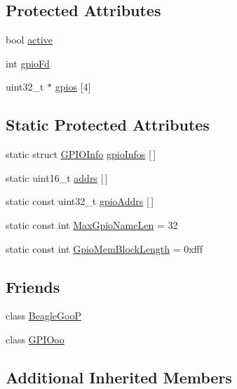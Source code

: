 \subsection*{Protected Attributes}
\begin{DoxyCompactItemize}
\item 
bool \hyperlink{struct_beagle_goo_a64e92bad467b29cb868bec64d1f6be6f}{active}
\item 
int \hyperlink{struct_beagle_goo_a1d4a232a0dbb10d38249e239c7e04788}{gpio\-Fd}
\item 
uint32\-\_\-t $\ast$ \hyperlink{struct_beagle_goo_aaa05aec2adfcadae3912e861ae35d50b}{gpios} \mbox{[}4\mbox{]}
\end{DoxyCompactItemize}
\subsection*{Static Protected Attributes}
\begin{DoxyCompactItemize}
\item 
static struct \hyperlink{struct_beagle_goo_1_1_g_p_i_o_info}{G\-P\-I\-O\-Info} \hyperlink{struct_beagle_goo_a2856c2fe9e24825ffd5691ab9a53d1f8}{gpio\-Infos} \mbox{[}$\,$\mbox{]}
\item 
static uint16\-\_\-t \hyperlink{struct_beagle_goo_a13b31f0a40c07bd0ca8c9d9fa51ae60a}{addrs} \mbox{[}$\,$\mbox{]}
\item 
static const uint32\-\_\-t \hyperlink{struct_beagle_goo_a709c4761b20d2db44096036573d3285f}{gpio\-Addrs} \mbox{[}$\,$\mbox{]}
\item 
static const int \hyperlink{struct_beagle_goo_ae4b9d09b2bfaf386c5d6fb9fdee0d4fa}{Max\-Gpio\-Name\-Len} = 32
\item 
static const int \hyperlink{struct_beagle_goo_a0d7150aa275f183b3c552ab89584f272}{Gpio\-Mem\-Block\-Length} = 0xfff
\end{DoxyCompactItemize}
\subsection*{Friends}
\begin{DoxyCompactItemize}
\item 
class \hyperlink{struct_beagle_goo_a3c53b8008fd7b4a4dc43d5c025cfb91f}{Beagle\-Goo\-P}
\item 
class \hyperlink{struct_beagle_goo_ad655c01bbbf0f8f066500cb0ea296455}{G\-P\-I\-Ooo}
\end{DoxyCompactItemize}
\subsection*{Additional Inherited Members}



